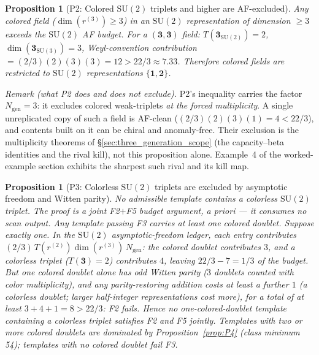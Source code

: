 \documentclass[11pt]{article}
\newtheorem{proposition}[theorem]{Proposition}
\theoremstyle{definition}
\newcommand{\SU}{\mathrm{SU}}
\begin{document}
\begin{proposition}[P2: Colored $\SU(2)$ triplets and higher are AF-excluded]
\label{prop:P2}
Any colored field ($\dim(r^{(3)}) \ge 3$) in an $\SU(2)$
representation of dimension $\ge 3$ exceeds the $\SU(2)$ AF budget.
For a $(\mathbf{3}, \mathbf{3})$ field: $T(\mathbf{3}_{\SU(2)}) = 2$,
$\dim(\mathbf{3}_{\SU(3)}) = 3$, Weyl-convention contribution
$= (2/3)(2)(3)(3) = 12 > 22/3 \approx 7.33$.  Therefore colored fields are
restricted to $\SU(2)$ representations $\{\mathbf{1}, \mathbf{2}\}$.
\end{proposition}

\noindent\emph{Remark (what P2 does and does not exclude).}  P2's inequality
carries the factor $N_{\mathrm{gen}} = 3$: it excludes colored weak-triplets
\emph{at the forced multiplicity}.  A single unreplicated copy of such a field
is AF-clean ($ (2/3)(2)(3)(1) = 4 < 22/3$), and contents built on it can be
chiral and anomaly-free.  Their exclusion is the multiplicity theorems of
\S\ref{sec:three_generation_scope} (the capacity--beta identities and the
rival kill), not this proposition alone.  Example~4 of the worked-example
section exhibits the sharpest such rival and its kill map.

\begin{proposition}[P3: Colorless $\SU(2)$ triplets are excluded by
asymptotic freedom and Witten parity]
\label{prop:P3}
No admissible template contains a colorless $\SU(2)$ triplet.  The
proof is a joint F2$+$F5 budget argument, a priori --- it consumes no
scan output.  Any template passing F3 carries at least one colored
doublet.  Suppose exactly one.  In the $\SU(2)$ asymptotic-freedom
ledger, each entry contributes
$(2/3)\,T(r^{(2)})\dim(r^{(3)})\,N_{\mathrm{gen}}$: the colored
doublet contributes $3$, and a colorless triplet ($T(\mathbf{3}) = 2$)
contributes $4$, leaving $22/3 - 7 = 1/3$ of the budget.  But one
colored doublet alone has odd Witten parity ($3$ doublets counted with
color multiplicity), and any parity-restoring addition costs at least
a further $1$ (a colorless doublet; larger half-integer
representations cost more), for a total of at least
$3 + 4 + 1 = 8 > 22/3$: F2 fails.  Hence no one-colored-doublet
template containing a colorless triplet satisfies F2 and F5 jointly.
Templates with two or more colored doublets are dominated by
Proposition~\ref{prop:P4} (class minimum 54); templates with no
colored doublet fail F3.
\end{proposition}
\end{document}
